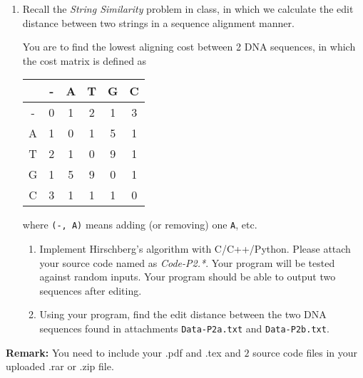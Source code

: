 \documentclass[12pt,a4paper]{article}
\makeatletter
\newtheorem*{solution}{Solution}
\theoremstyle{definition}
\renewenvironment{solution}[1][Solution] {\par\pushQED{\qed}\normalfont\topsep6\p@\@plus6\p@\relax\trivlist\item[\hskip\labelsep\bfseries#1\@addpunct{.}]\ignorespaces}{\popQED\endtrivlist\@endpefalse} \makeatother
\makeatother
\begin{document}
\begin{enumerate}
    \item
    Recall the \emph{String Similarity} problem in class, in which we calculate the edit distance between two strings in a sequence alignment manner.

    You are to find the lowest aligning cost between 2 DNA sequences, in which the cost matrix is defined as

    \begin{center}
        \begin{tabular}{|c||c|c|c|c|c|}
        \hline
          & - & A & T & G & C \\
        \hline
        - & 0 & 1 & 2 & 1 & 3 \\
        A & 1 & 0 & 1 & 5 & 1 \\
        T & 2 & 1 & 0 & 9 & 1 \\
        G & 1 & 5 & 9 & 0 & 1 \\
        C & 3 & 1 & 1 & 1 & 0 \\
        \hline
        \end{tabular}
    \end{center}

    where \texttt{(-, A)} means adding (or removing) one \texttt{A}, etc.

    \begin{enumerate}
        \item
        Implement Hirschberg's algorithm with C/C++/Python. Please attach your source code named as {\color{red}\emph{Code-P2.*}}. Your program will be tested against random inputs. Your program should be able to output two sequences after editing.

        \item
        Using your program, find the edit distance between the two DNA sequences found in attachments \texttt{Data-P2a.txt} and \texttt{Data-P2b.txt}.
    \end{enumerate}

\end{enumerate}

\vspace{20pt}

\textbf{Remark:} You need to include your .pdf and .tex and {\color{red}\emph{$2$}} source code files in your uploaded .rar or .zip file.

\end{document}
